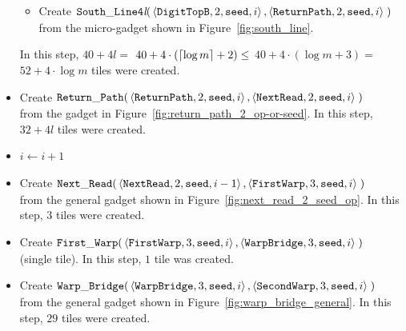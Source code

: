 \begin{itemize}
\begin{itemize}
        \item Create
        $\begin{aligned}[t]
            {\tt South\_Line4\textit{l}}(&\left\langle {\tt DigitTopB},  2, {\tt seed}, i \right\rangle,
                                          \left\langle {\tt ReturnPath}, 2, {\tt seed}, i \right\rangle \;)
        \end{aligned}$\\ from the micro-gadget shown in Figure~\ref{fig:south_line}.
    \end{itemize}
    In this step, $40 + 4l =$
    $40 + 4 \cdot \left( \ceil*{\log m} + 2 \right) \leq$
    $40 + 4 \cdot \left( {\log m} + 3 \right) =$
    $52 + 4 \cdot {\log m}$ tiles were created.

    \item Create
    $\begin{aligned}[t]
        \returnpath(&\left\langle {\tt ReturnPath}, 2, {\tt seed}, i \right\rangle,
                     \left\langle {\tt NextRead},   2, {\tt seed}, i \right\rangle \;)
    \end{aligned}$\\ from the gadget in Figure~\ref{fig:return_path_2_op-or-seed}.
    In this step, $32 + 4l$ tiles were created.

    \item $i \gets i + 1$

    \item Create
    $\begin{aligned}[t]
        \nextread(&\left\langle {\tt NextRead},  2, {\tt seed}, i - 1 \right\rangle,
                   \left\langle {\tt FirstWarp}, 3, {\tt seed}, i     \right\rangle \;)
    \end{aligned}$\\ from the general gadget shown in Figure~\ref{fig:next_read_2_seed_op}.
    In this step, $3$ tiles were created.

    \item Create
    $\begin{aligned}[t]
        \firstwarp(&\left\langle {\tt FirstWarp},  3, {\tt seed}, i \right\rangle,
                    \left\langle {\tt WarpBridge}, 3, {\tt seed}, i \right\rangle \;)
    \end{aligned}$ (single tile).
    In this step, $1$ tile was created.

    \item Create
    $\begin{aligned}[t]
        \warpbridge(&\left\langle {\tt WarpBridge}, 3, {\tt seed}, i \right\rangle,
                     \left\langle {\tt SecondWarp}, 3, {\tt seed}, i \right\rangle \;)
    \end{aligned}$\\ from the general gadget shown in Figure~\ref{fig:warp_bridge_general}.
    In this step, $29$ tiles were created.


\end{itemize}
